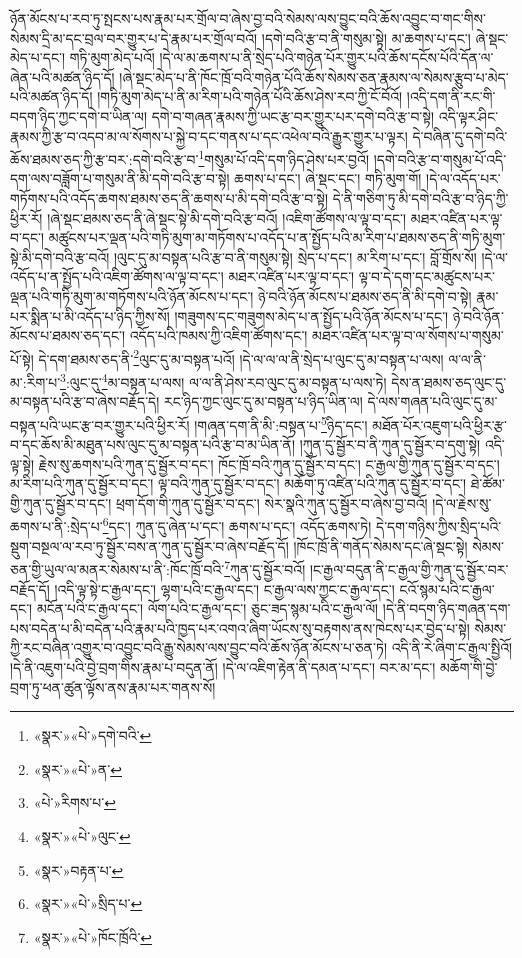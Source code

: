 ཉོན་མོངས་པ་རབ་ཏུ་སྤངས་པས་རྣམ་པར་གྲོལ་བ་ཞེས་བྱ་བའི་སེམས་ལས་བྱུང་བའི་ཆོས་འབྱུང་བ་གང་གིས་སེམས་དྲི་མ་དང་བྲལ་བར་གྱུར་པ་དེ་རྣམ་པར་གྲོལ་བའོ། །དགེ་བའི་རྩ་བ་ནི་གསུམ་སྟེ། མ་ཆགས་པ་དང་། ཞེ་སྡང་མེད་པ་དང་། གཏི་མུག་མེད་པའོ། །དེ་ལ་མ་ཆགས་པ་ནི་སྲེད་པའི་གཉེན་པོར་གྱུར་པའི་ཆོས་དངོས་པོའི་དོན་ལ་ཞེན་པའི་མཚན་ཉིད་དོ། །ཞེ་སྡང་མེད་པ་ནི་ཁོང་ཁྲོ་བའི་གཉེན་པོའི་ཆོས་སེམས་ཅན་རྣམས་ལ་སེམས་རྩུབ་པ་མེད་པའི་མཚན་ཉིད་དོ། །གཏི་མུག་མེད་པ་ནི་མ་རིག་པའི་གཉེན་པོའི་ཆོས་ཤེས་རབ་ཀྱི་ངོ་བོའོ། །འདི་དག་ནི་རང་གི་བདག་ཉིད་ཀྱང་དགེ་བ་ཡིན་ལ། དགེ་བ་གཞན་རྣམས་ཀྱི་ཡང་རྩ་བར་གྱུར་པར་དགེ་བའི་རྩ་བ་སྟེ། འདི་ལྟར་ཤིང་རྣམས་ཀྱི་རྩ་བ་འདབ་མ་ལ་སོགས་པ་སྐྱེ་བ་དང་གནས་པ་དང་འཕེལ་བའི་རྒྱུར་གྱུར་པ་ལྟར། དེ་བཞིན་དུ་དགེ་བའི་ཆོས་ཐམས་ཅད་ཀྱི་རྩ་བར་:དགེ་བའི་རྩ་བ་\footnote{«སྣར་»«པེ་»དགེ་བའི་}གསུམ་པོ་འདི་དག་ཉིད་ཤེས་པར་བྱའོ། །དགེ་བའི་རྩ་བ་གསུམ་པོ་འདི་དག་ལས་བཟློག་པ་གསུམ་ནི་མི་དགེ་བའི་རྩ་བ་སྟེ། ཆགས་པ་དང་། ཞེ་སྡང་དང་། གཏི་མུག་གོ། །དེ་ལ་འདོད་པར་གཏོགས་པའི་འདོད་ཆགས་ཐམས་ཅད་ནི་ཆགས་པ་མི་དགེ་བའི་རྩ་བ་སྟེ། དེ་ནི་གཅིག་ཏུ་མི་དགེ་བའི་རྩ་བ་ཉིད་ཀྱི་ཕྱིར་རོ། །ཞེ་སྡང་ཐམས་ཅད་ནི་ཞེ་སྡང་སྟེ་མི་དགེ་བའི་རྩ་བའོ། །འཇིག་ཚོགས་ལ་ལྟ་བ་དང་། མཐར་འཛིན་པར་ལྟ་བ་དང་། མཚུངས་པར་ལྡན་པའི་གཏི་མུག་མ་གཏོགས་པ་འདོད་པ་ན་སྤྱོད་པའི་མ་རིག་པ་ཐམས་ཅད་ནི་གཏི་མུག་སྟེ་མི་དགེ་བའི་རྩ་བའོ། །ལུང་དུ་མ་བསྟན་པའི་རྩ་བ་ནི་གསུམ་སྟེ། སྲེད་པ་དང་། མ་རིག་པ་དང་། བློ་གྲོས་སོ། །དེ་ལ་འདོད་པ་ན་སྤྱོད་པའི་འཇིག་ཚོགས་ལ་ལྟ་བ་དང་། མཐར་འཛིན་པར་ལྟ་བ་དང་། ལྟ་བ་དེ་དག་དང་མཚུངས་པར་ལྡན་པའི་གཏི་མུག་མ་གཏོགས་པའི་ཉོན་མོངས་པ་དང་། ཉེ་བའི་ཉོན་མོངས་པ་ཐམས་ཅད་ནི་མི་དགེ་བ་སྟེ། རྣམ་པར་སྨིན་པ་མི་འདོད་པ་ཉིད་ཀྱིས་སོ། །གཟུགས་དང་གཟུགས་མེད་པ་ན་སྤྱོད་པའི་ཉོན་མོངས་པ་དང་། ཉེ་བའི་ཉོན་མོངས་པ་ཐམས་ཅད་དང་། འདོད་པའི་ཁམས་ཀྱི་འཇིག་ཚོགས་དང་། མཐར་འཛིན་པར་ལྟ་བ་ལ་སོགས་པ་གསུམ་པོ་སྟེ། དེ་དག་ཐམས་ཅད་ནི་\footnote{«སྣར་»«པེ་»ན་}ལུང་དུ་མ་བསྟན་པའོ། །དེ་ལ་ལ་ལ་ནི་སྲེད་པ་ལུང་དུ་མ་བསྟན་པ་ལས། ལ་ལ་ནི་མ་:རིག་པ་\footnote{«པེ་»རིགས་པ་}:ལུང་དུ་\footnote{«སྣར་»«པེ་»ལུང་}མ་བསྟན་པ་ལས། ལ་ལ་ནི་ཤེས་རབ་ལུང་དུ་མ་བསྟན་པ་ལས་ཏེ། དེས་ན་ཐམས་ཅད་ལུང་དུ་མ་བསྟན་པའི་རྩ་བ་ཞེས་བརྗོད་དེ། རང་ཉིད་ཀྱང་ལུང་དུ་མ་བསྟན་པ་ཉིད་ཡིན་ལ། དེ་ལས་གཞན་པའི་ལུང་དུ་མ་བསྟན་པའི་ཡང་རྩ་བར་གྱུར་པའི་ཕྱིར་རོ། །གཞན་དག་ནི་མི་:བསྟན་པ་\footnote{«སྣར་»བརྟན་པ་}ཉིད་དང་། མཐོན་པོར་འཇུག་པའི་ཕྱིར་རྩ་བ་དང་ཆོས་མི་མཐུན་པས་ལུང་དུ་མ་བསྟན་པའི་རྩ་བ་མ་ཡིན་ནོ། །ཀུན་དུ་སྦྱོར་བ་ནི་ཀུན་དུ་སྦྱོར་བ་དགུ་སྟེ། འདི་ལྟ་སྟེ། རྗེས་སུ་ཆགས་པའི་ཀུན་དུ་སྦྱོར་བ་དང་། ཁོང་ཁྲོ་བའི་ཀུན་དུ་སྦྱོར་བ་དང་། ང་རྒྱལ་གྱི་ཀུན་དུ་སྦྱོར་བ་དང་། མ་རིག་པའི་ཀུན་དུ་སྦྱོར་བ་དང་། ལྟ་བའི་ཀུན་དུ་སྦྱོར་བ་དང་། མཆོག་ཏུ་འཛིན་པའི་ཀུན་དུ་སྦྱོར་བ་དང་། ཐེ་ཚོམ་གྱི་ཀུན་དུ་སྦྱོར་བ་དང་། ཕྲག་དོག་གི་ཀུན་དུ་སྦྱོར་བ་དང་། སེར་སྣའི་ཀུན་དུ་སྦྱོར་བ་ཞེས་བྱ་བའོ། །དེ་ལ་རྗེས་སུ་ཆགས་པ་ནི་:སྲེད་པ་\footnote{«སྣར་»«པེ་»སྲིད་པ་}དང་། ཀུན་དུ་ཞེན་པ་དང་། ཆགས་པ་དང་། འདོད་ཆགས་ཏེ། དེ་དག་གཉིས་ཀྱིས་སྲིད་པའི་སྡུག་བསྔལ་ལ་རབ་ཏུ་སྦྱོར་བས་ན་ཀུན་དུ་སྦྱོར་བ་ཞེས་བརྗོད་དོ། །ཁོང་ཁྲོ་ནི་གནོད་སེམས་དང་ཞེ་སྡང་སྟེ། སེམས་ཅན་གྱི་ཡུལ་ལ་མནར་སེམས་པ་ནི་:ཁོང་ཁྲོ་བའི་\footnote{«སྣར་»«པེ་»ཁོང་ཁྲོའི་}ཀུན་དུ་སྦྱོར་བའོ། །ང་རྒྱལ་བདུན་ནི་ང་རྒྱལ་གྱི་ཀུན་དུ་སྦྱོར་བར་བརྗོད་དོ། །འདི་ལྟ་སྟེ་ང་རྒྱལ་དང་། ལྷག་པའི་ང་རྒྱལ་དང་། ང་རྒྱལ་ལས་ཀྱང་ང་རྒྱལ་དང་། ངའོ་སྙམ་པའི་ང་རྒྱལ་དང་། མངོན་པའི་ང་རྒྱལ་དང་། ལོག་པའི་ང་རྒྱལ་དང་། ཅུང་ཟད་སྙམ་པའི་ང་རྒྱལ་ལོ། །དེ་ནི་བདག་ཉིད་གཞན་དག་པས་བདེན་པ་མི་བདེན་པའི་རྣམ་པའི་ཁྱད་པར་འགའ་ཞིག་ཡོངས་སུ་བརྟགས་ནས་ཁེངས་པར་བྱེད་པ་སྟེ། སེམས་ཀྱི་རང་བཞིན་འགྱུར་བ་འབྱུང་བའི་རྒྱུ་སེམས་ལས་བྱུང་བའི་ཆོས་ཉོན་མོངས་པ་ཅན་ཏེ། འདི་ནི་རེ་ཞིག་ང་རྒྱལ་སྤྱིའོ། །དེ་ནི་འཇུག་པའི་བྱེ་བྲག་གིས་རྣམ་པ་བདུན་ནོ། །དེ་ལ་འཇིག་རྟེན་ནི་དམན་པ་དང་། བར་མ་དང་། མཆོག་གི་བྱེ་བྲག་ཏུ་ཕན་ཚུན་ལྟོས་ནས་རྣམ་པར་གནས་སོ། 